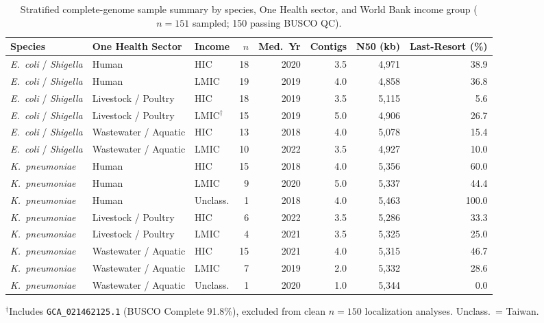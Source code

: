 \documentclass[11pt,a4paper]{article}
\begin{document}
\begin{table}[!htbp]
\centering
\caption{Stratified complete-genome sample summary by species, One Health sector, and World Bank income group ($n = 151$ sampled; 150 passing BUSCO QC).}
\label{tab:cohort}
\small
\begin{tabularx}{\linewidth}{@{}l X l r r r r r@{}}
\toprule
\textbf{Species} & \textbf{One Health Sector} & \textbf{Income} & \textbf{$n$} & \textbf{Med.\ Yr} & \textbf{Contigs} & \textbf{N50 (kb)} & \textbf{Last-Resort (\%)} \\
\midrule
\textit{E.~coli} / \textit{Shigella} & Human & HIC & 18 & 2020 & 3.5 & 4,971 & 38.9 \\
\textit{E.~coli} / \textit{Shigella} & Human & LMIC & 19 & 2019 & 4.0 & 4,858 & 36.8 \\
\textit{E.~coli} / \textit{Shigella} & Livestock / Poultry & HIC & 18 & 2019 & 3.5 & 5,115 & 5.6 \\
\textit{E.~coli} / \textit{Shigella} & Livestock / Poultry & LMIC$^{\dagger}$ & 15 & 2019 & 5.0 & 4,906 & 26.7 \\
\textit{E.~coli} / \textit{Shigella} & Wastewater / Aquatic & HIC & 13 & 2018 & 4.0 & 5,078 & 15.4 \\
\textit{E.~coli} / \textit{Shigella} & Wastewater / Aquatic & LMIC & 10 & 2022 & 3.5 & 4,927 & 10.0 \\
\midrule
\textit{K.~pneumoniae} & Human & HIC & 15 & 2018 & 4.0 & 5,356 & 60.0 \\
\textit{K.~pneumoniae} & Human & LMIC & 9 & 2020 & 5.0 & 5,337 & 44.4 \\
\textit{K.~pneumoniae} & Human & Unclass. & 1 & 2018 & 4.0 & 5,463 & 100.0 \\
\textit{K.~pneumoniae} & Livestock / Poultry & HIC & 6 & 2022 & 3.5 & 5,286 & 33.3 \\
\textit{K.~pneumoniae} & Livestock / Poultry & LMIC & 4 & 2021 & 3.5 & 5,325 & 25.0 \\
\textit{K.~pneumoniae} & Wastewater / Aquatic & HIC & 15 & 2021 & 4.0 & 5,315 & 46.7 \\
\textit{K.~pneumoniae} & Wastewater / Aquatic & LMIC & 7 & 2019 & 2.0 & 5,332 & 28.6 \\
\textit{K.~pneumoniae} & Wastewater / Aquatic & Unclass. & 1 & 2020 & 1.0 & 5,344 & 0.0 \\
\bottomrule
\end{tabularx}
\vspace{2pt}
\raggedright\footnotesize{$^{\dagger}$Includes \texttt{GCA\_021462125.1} (BUSCO Complete 91.8\%), excluded from clean $n = 150$ localization analyses. Unclass.\ = Taiwan.}
\end{table}
\end{document}
